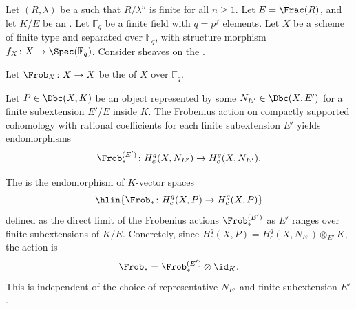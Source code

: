 \begin{definition} \label{definition:frobenius_action_on_compactly_supported_lambda_adic_cohomology_with_algebraic_coefficients}
    Let $(R, \lambda)$ be a   such that $R/\lambda^n$ is finite for all $n \geq 1$. Let $E = \Frac(R)$, and let $K/E$ be an . Let $\mathbb{F}_q$ be a finite field with $q = p^f$ elements. Let $X$ be a scheme of finite type and separated over $\mathbb{F}_q$, with structure morphism $f_X \colon X \to \Spec(\mathbb{F}_q)$. Consider sheaves on the .

    Let $\Frob_X \colon X \to X$ be the  of $X$ over $\mathbb{F}_q$.

    Let $P \in \Dbc(X, K)$ be an object represented by some $N_{E'} \in \Dbc(X, E')$ for a finite subextension $E'/E$ inside $K$. The Frobenius action on compactly supported cohomology with rational coefficients for each finite subextension $E'$ yields endomorphisms
    $$\Frob_*^{(E')} \colon H_c^q(X, N_{E'}) \to H_c^q(X, N_{E'}).$$

    The  is the endomorphism of $K$-vector spaces
    $$\hlin{\Frob_* \colon H_c^q(X, P) \to H_c^q(X, P)}$$
    defined as the direct limit of the Frobenius actions $\Frob_*^{(E')}$ as $E'$ ranges over finite subextensions of $K/E$. Concretely, since $H_c^q(X, P) = H_c^q(X, N_{E'}) \otimes_{E'} K$, the action is
    $$\Frob_* = \Frob_*^{(E')} \otimes \id_K.$$
    This is independent of the choice of representative $N_{E'}$ and finite subextension $E'$.
\end{definition}
